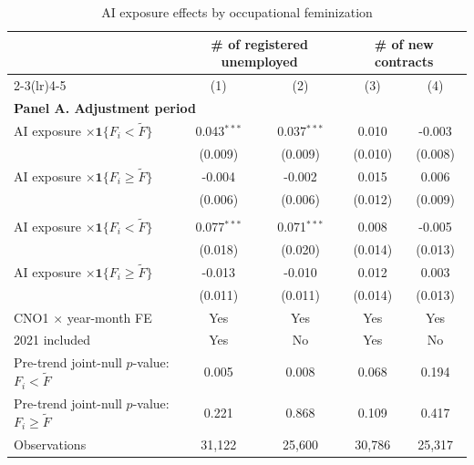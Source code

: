 \begin{table}[!htbp]
\centering
\caption{AI exposure effects by occupational feminization}
\label{tab:v1_feminization_median_split}
\begin{threeparttable}
\scriptsize
\setlength{\tabcolsep}{3.5pt}
\begin{tabular}{@{}lcccc@{}}
\toprule
& \multicolumn{2}{c}{\# of registered unemployed} & \multicolumn{2}{c}{\# of new contracts} \\
\cmidrule(lr){2-3}\cmidrule(lr){4-5}
& (1) & (2) & (3) & (4) \\
\midrule
\multicolumn{5}{l}{\textbf{Panel A. Adjustment period}} \\
AI exposure $\times \mathbf{1}\{F_i < \widetilde F\}$ & 0.043$^{***}$ & 0.037$^{***}$ & 0.010 & -0.003 \\
 & (0.009) & (0.009) & (0.010) & (0.008) \\
AI exposure $\times \mathbf{1}\{F_i \geq \widetilde F\}$ & -0.004 & -0.002 & 0.015 & 0.006 \\
 & (0.006) & (0.006) & (0.012) & (0.009) \\
\addlinespace[2pt]
\multicolumn{5}{l}{\textbf{Panel B. Later post-treatment period}} \\
AI exposure $\times \mathbf{1}\{F_i < \widetilde F\}$ & 0.077$^{***}$ & 0.071$^{***}$ & 0.008 & -0.005 \\
 & (0.018) & (0.020) & (0.014) & (0.013) \\
AI exposure $\times \mathbf{1}\{F_i \geq \widetilde F\}$ & -0.013 & -0.010 & 0.012 & 0.003 \\
 & (0.011) & (0.011) & (0.014) & (0.013) \\
\midrule
CNO1 $\times$ year-month FE & Yes & Yes & Yes & Yes \\
2021 included & Yes & No & Yes & No \\
Pre-trend joint-null $p$-value: $F_i < \widetilde F$ & 0.005 & 0.008 & 0.068 & 0.194 \\
Pre-trend joint-null $p$-value: $F_i \geq \widetilde F$ & 0.221 & 0.868 & 0.109 & 0.417 \\
Observations & 31,122 & 25,600 & 30,786 & 25,317 \\
\bottomrule
\end{tabular}
\begin{tablenotes}[flushleft]
\footnotesize

\end{tablenotes}
\end{threeparttable}
\end{table}
